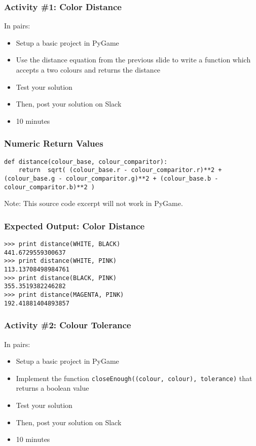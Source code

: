 \begin{frame}
	\frametitle{Activity \#1: Color Distance}
	
	In pairs:
	
	\vspace{2em}
	
	\begin{itemize}		
		\item Setup a basic project in PyGame
		\item Use the distance equation from the previous slide to write a function which accepts a two colours and returns the distance
		\item Test your solution
		\item Then, post your solution on Slack
		\item 10 minutes
	\end{itemize}
\end{frame}

\begin{frame}[fragile]
	\frametitle{Numeric Return Values}
	
\begin{lstlisting}
def distance(colour_base, colour_comparitor):
    return  sqrt( (colour_base.r - colour_comparitor.r)**2 + (colour_base.g - colour_comparitor.g)**2 + (colour_base.b - colour_comparitor.b)**2 )
\end{lstlisting}

Note: This source code excerpt will not work in PyGame.

\end{frame}

\begin{frame}[fragile]
	\frametitle{Expected Output: Color Distance}
	
\begin{lstlisting}
>>> print distance(WHITE, BLACK)
441.6729559300637
>>> print distance(WHITE, PINK)
113.13708498984761
>>> print distance(BLACK, PINK)
355.3519382246282
>>> print distance(MAGENTA, PINK)
192.41881404893857
\end{lstlisting}

\end{frame}

\begin{frame}
	\frametitle{Activity \#2: Colour Tolerance}
	
	In pairs:
	
	\vspace{2em}
	
	\begin{itemize}		
		\item Setup a basic project in PyGame
		\item Implement the function \texttt{closeEnough((colour, colour), tolerance)} that returns a boolean value
		\item Test your solution
		\item Then, post your solution on Slack
		\item 10 minutes
	\end{itemize}
\end{frame}

